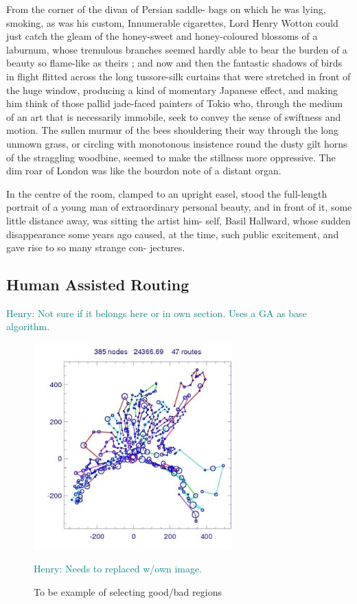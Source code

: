 \documentclass{sig-alternate}
\newcommand{\allcomments}[1]{{#1}}
\newcommand{\hfcomment}[1]{\textcolor{Teal}{\allcomments{Henry: {#1}}}}
\begin{document}
{From the corner of the divan of Persian saddle- 
bags on which he was lying, smoking, as was his 
custom, Innumerable cigarettes, Lord Henry Wotton 
could just catch the gleam of the honey-sweet and 
honey-coloured blossoms of a laburnum, whose 
tremulous branches seemed hardly able to bear the 
burden of a beauty so flame-like as theirs ; and 
now and then the fantastic shadows of birds in 
flight flitted across the long tussore-silk curtains 
that were stretched in front of the huge window, 
producing a kind of momentary Japanese effect, 
and making him think of those pallid jade-faced 
painters of Tokio who, through the medium of an 
art that is necessarily immobile, seek to convey the 
sense of swiftness and motion. The sullen murmur 
of the bees shouldering their way through the long 
unmown grass, or circling with monotonous insistence 
round the dusty gilt horns of the straggling woodbine, 
seemed to make the stillness more oppressive. The
dim roar of London was like the bourdon note of a 
distant organ. 

In the centre of the room, clamped to an upright 
easel, stood the full-length portrait of a young man 
of extraordinary personal beauty, and in front of it, 
some little distance away, was sitting the artist him- 
self, Basil Hallward, whose sudden disappearance 
some years ago caused, at the time, such public 
excitement, and gave rise to so many strange con- 
jectures. 

\subsection{Human Assisted Routing}
\label{sec:humans}
\hfcomment{Not sure if it belongs here or in own section. Uses a GA as base algorithm.}

\begin{figure}
\centering
\includegraphics[width=3in, keepaspectratio]{vrp2.jpg}
\caption{To be example of selecting good/bad regions}
\hfcomment{Needs to replaced w/own image.}
\label{fig:Humangraph}
\end{figure}

}
\end{document}
